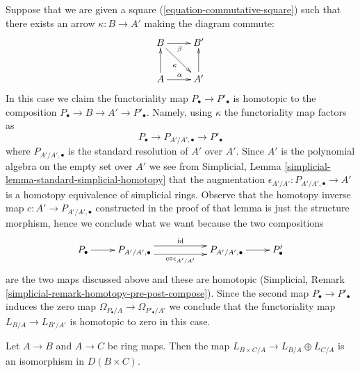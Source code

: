 \begin{remark}
\label{remark-homotopy-triangle}
Suppose that we are given a square (\ref{equation-commutative-square})
such that there exists an arrow $\kappa : B \to A'$ making the diagram
commute:
$$
\xymatrix{
B \ar[r]_\beta \ar[rd]_\kappa & B' \\
A \ar[u] \ar[r]^\alpha & A' \ar[u]
}
$$
In this case we claim the functoriality map $P_\bullet \to P'_\bullet$
is homotopic to the composition $P_\bullet \to B \to A' \to P'_\bullet$.
Namely, using $\kappa$ the functoriality map factors as
$$
P_\bullet \to P_{A'/A', \bullet} \to P'_\bullet
$$
where $P_{A'/A', \bullet}$ is the standard resolution of $A'$ over $A'$.
Since $A'$ is the polynomial algebra on the empty set over $A'$ we
see from Simplicial, Lemma \ref{simplicial-lemma-standard-simplicial-homotopy}
that the augmentation $\epsilon_{A'/A'} : P_{A'/A', \bullet} \to A'$
is a homotopy equivalence of simplicial rings. Observe that the homotopy
inverse map $c : A' \to P_{A'/A', \bullet}$ constructed in the proof of
that lemma is just the structure morphism, hence
we conclude what we want because the two compositions
$$
\xymatrix{
P_\bullet \ar[r] &
P_{A'/A', \bullet} \ar@<1ex>[rr]^{\text{id}}
\ar@<-1ex>[rr]_{c \circ \epsilon_{A'/A'}} & &
P_{A'/A', \bullet} \ar[r] &
P'_\bullet
}
$$
are the two maps discussed above and these are homotopic
(Simplicial, Remark \ref{simplicial-remark-homotopy-pre-post-compose}).
Since the second map $P_\bullet \to P'_\bullet$ induces the zero
map $\Omega_{P_\bullet/A} \to \Omega_{P'_\bullet/A'}$ we conclude
that the functoriality map $L_{B/A} \to L_{B'/A'}$ is homotopic
to zero in this case.
\end{remark}

\begin{lemma}
\label{lemma-cotangent-complex-product}
Let $A \to B$ and $A \to C$ be ring maps.
Then the map $L_{B \times C/A} \to L_{B/A} \oplus L_{C/A}$ is
an isomorphism in $D(B \times C)$.
\end{lemma}

